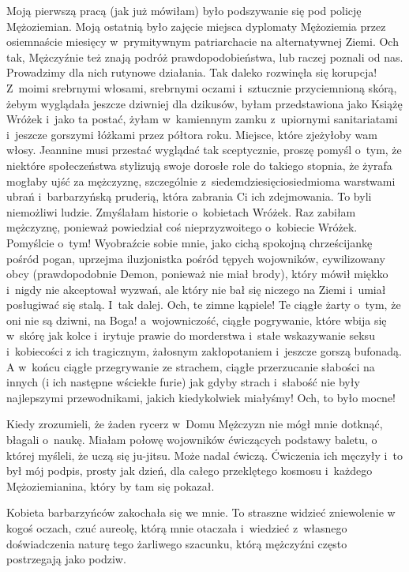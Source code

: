 \documentclass[oneside,polish,12pt,sfheadings]{mwbk}
\begin{document}
Moją pierwszą pracą (jak już mówiłam) było podszywanie się pod policję
Mężoziemian. Moją ostatnią było zajęcie miejsca dyplomaty Mężoziemia
przez osiemnaście miesięcy w~prymitywnym patriarchacie na alternatywnej
Ziemi. Och tak, Mężczyźnie też znają podróż prawdopodobieństwa, lub
raczej poznali od nas. Prowadzimy dla nich rutynowe działania. Tak
daleko rozwinęła się korupcja! Z~moimi srebrnymi włosami, srebrnymi
oczami i~sztucznie przyciemnioną skórą, żebym wyglądała jeszcze dziwniej
dla dzikusów, byłam przedstawiona jako Książę Wróżek i~jako ta postać,
żyłam w~kamiennym zamku z~upiornymi sanitariatami i~jeszcze gorszymi
łóżkami przez półtora roku. Miejsce, które zjeżyłoby wam włosy. Jeannine
musi przestać wyglądać tak sceptycznie, proszę pomyśl o~tym, że niektóre
społeczeństwa stylizują swoje dorosłe role do takiego stopnia, że
żyrafa mogłaby ujść za mężczyznę, szczególnie z~siedemdziesięciosiedmioma
warstwami ubrań i~barbarzyńską pruderią, która zabrania Ci ich zdejmowania.
To byli niemożliwi ludzie. Zmyślałam historie o~kobietach Wróżek.
Raz zabiłam mężczyznę, ponieważ powiedział coś nieprzyzwoitego o~kobiecie
Wróżek. Pomyślcie o~tym! Wyobraźcie sobie mnie, jako cichą spokojną
chrześcijankę pośród pogan, uprzejma iluzjonistka pośród tępych wojowników,
cywilizowany obcy (prawdopodobnie Demon, ponieważ nie miał brody),
który mówił miękko i~nigdy nie akceptował wyzwań, ale który nie bał
się niczego na Ziemi i~umiał posługiwać się stalą. I~tak dalej. Och,
te zimne kąpiele! Te ciągłe żarty o~tym, że oni nie są dziwni, na
Boga! a~wojowniczość, ciągłe pogrywanie, które wbija się w~skórę jak
kolce i~irytuje prawie do morderstwa i~stałe wskazywanie seksu i~kobiecości
z ich tragicznym, żałosnym zakłopotaniem i~jeszcze gorszą bufonadą.
A w~końcu ciągłe przegrywanie ze strachem, ciągłe przerzucanie słabości
na innych (i ich następne wściekłe furie) jak gdyby strach i~słabość
nie były najlepszymi przewodnikami, jakich kiedykolwiek miałyśmy!
Och, to było mocne!

Kiedy zrozumieli, że żaden rycerz w~Domu Mężczyzn nie mógł mnie dotknąć,
błagali o~naukę. Miałam połowę wojowników ćwiczących podstawy baletu,
o której myśleli, że uczą się ju-jitsu. Może nadal ćwiczą. Ćwiczenia
ich męczyły i~to był mój podpis, prosty jak dzień, dla całego przeklętego
kosmosu i~każdego Mężoziemianina, który by tam się pokazał.

Kobieta barbarzyńców zakochała się we mnie. To straszne widzieć zniewolenie
w kogoś oczach, czuć aureolę, którą mnie otaczała i~wiedzieć z~własnego
doświadczenia naturę tego żarliwego szacunku, którą mężczyźni często
postrzegają jako podziw.
\end{document}
